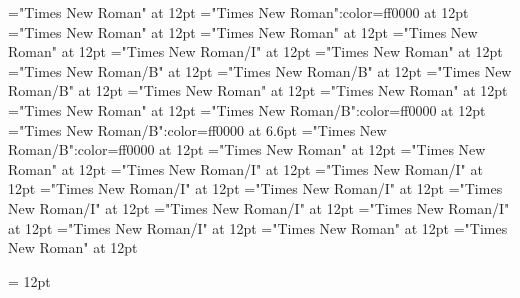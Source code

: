 \documentclass[a4paper]{article}
\begin{document}
\pagestyle{plain}
\sloppy
\setlength{\parfillskip}{0pt plus 1fil}
\font\spanen="Times New Roman" at 12pt
\font\spanur="Times New Roman":color=ff0000 at 12pt
\font\diven="Times New Roman" at 12pt
\font\divur="Times New Roman" at 12pt
\font\xitemxitemdefinitionbefore="Times New Roman" at 12pt
\font\xitemxitemexamplebefore="Times New Roman/I" at 12pt
\font\xitemxitemexamplesbefore="Times New Roman" at 12pt
\font\xitemxitemheadwordbefore="Times New Roman/B" at 12pt
\font\xitemxitemheadwordminorbefore="Times New Roman/B" at 12pt
\font\xitemxitemLexEntrypublishRootMinorPrimaryTargetHeadWordRefbefore="Times New Roman/B" at 12pt
\font\xitemxitemlexreftargetsbefore="Times New Roman" at 12pt
\font{}="Times New Roman" at 12pt
\font\entryletDatadicBody="Times New Roman" at 12pt
\font\headwordurentryletDatadicBody="Times New Roman/B":color=ff0000 at 12pt
\font\xhomographnumberheadwordurentryletDatadicBody="Times New Roman/B":color=ff0000 at 6.6pt
\font\spanenheadwordurentryletDatadicBody="Times New Roman/B":color=ff0000 at 12pt
\font\sensesentryletDatadicBody="Times New Roman" at 12pt
\font\sensesensesentryletDatadicBody="Times New Roman" at 12pt
\font\grammaticalinfosensesensesentryletDatadicBody="Times New Roman/I" at 12pt
\font\partofspeechengrammaticalinfosensesensesentryletDatadicBody="Times New Roman/I" at 12pt
\font\spanenpartofspeechengrammaticalinfosensesensesentryletDatadicBody="Times New Roman/I" at 12pt
\font\slotsgrammaticalinfosensesensesentryletDatadicBody="Times New Roman/I" at 12pt
\font\spanenslotsgrammaticalinfosensesensesentryletDatadicBody="Times New Roman/I" at 12pt
\font\slotnameenslotsgrammaticalinfosensesensesentryletDatadicBody="Times New Roman/I" at 12pt
\font\spanenslotnameenslotsgrammaticalinfosensesensesentryletDatadicBody="Times New Roman/I" at 12pt
\font\spanengrammaticalinfosensesensesentryletDatadicBody="Times New Roman/I" at 12pt
\font{}="Times New Roman" at 12pt
\font\spanendefinitionensensesensesentryletDatadicBody="Times New Roman" at 12pt

\mbox{} 
\newpage 
\newpage 
\setcounter{page}{1} 
\pagestyle{fancy} 
\setlength{\columnsep}{1.5em} 
\setlength\columnseprule{0.4pt} 
\begin{multicols}{2}{\raggedleft} \begin{spacing}{1.5}
\hangindent= 12pt
  \spanenslotsgrammaticalinfosensesensesentryletDatadicBody{: }  \end{spacing}
 \end{multicols}
\end{document}
